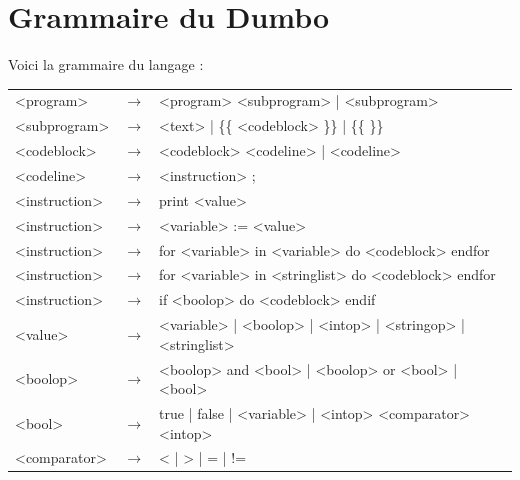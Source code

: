 \documentclass[10pt,a4paper]{article}
\begin{document}
	\section{Grammaire du Dumbo}
	Voici la grammaire du langage :\\
	\begin{tabular}{|l l l|}
		\hline
		
		<program> & $\longrightarrow$ & <program> <subprogram> | <subprogram>\\
		<subprogram> & $\longrightarrow$ & <text> | \{\{ <codeblock> \}\} | \{\{ \}\}\\
		<codeblock> & $\longrightarrow$ & <codeblock> <codeline> | <codeline> \\
		<codeline> & $\longrightarrow$ & <instruction> ;\\
		<instruction> & $\longrightarrow$ & print <value>\\
		<instruction> & $\longrightarrow$ & <variable> := <value>\\
		<instruction> & $\longrightarrow$ & for <variable> in <variable> do <codeblock> endfor\\
		<instruction> & $\longrightarrow$ & for <variable> in <stringlist> do <codeblock> endfor\\
		<instruction> & $\longrightarrow$ & if <boolop> do <codeblock> endif\\
		
		<value> & $\longrightarrow$ & <variable> | <boolop> | <intop> | <stringop> | <stringlist>\\
		
		<boolop> & $\longrightarrow$ & <boolop> and <bool> | <boolop> or <bool> | <bool>\\
		<bool> & $\longrightarrow$ & true | false | <variable> | <intop> <comparator> <intop>\\
		<comparator> & $\longrightarrow$ & < | > | = | !=\\
		

\end{tabular}
\end{document}
